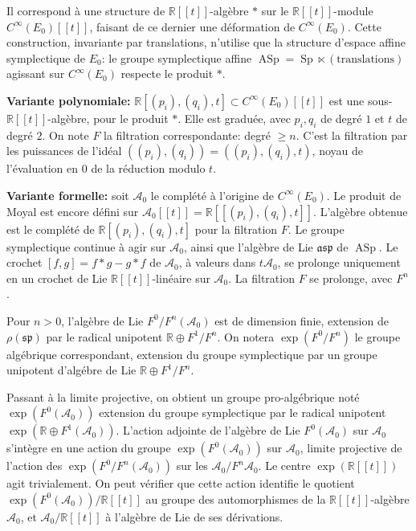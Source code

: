 \documentclass[11pt,a4paper]{article}
\theoremstyle{plain}
\theoremstyle{definition}
\DeclareMathOperator{\Sp}{Sp}
\DeclareMathOperator{\ASp}{ASp}
\newcommand{\R}{\mathbb{R}}
\begin{document}
Il correspond \`a une structure de $\R[[t]]$-alg\`ebre $*$ sur le $\R[[t]]$-module $C^{\infty}(E_{0})[[t]]$,
faisant de ce dernier une d\'eformation de $C^{\infty}(E_{0})$. Cette construction, invariante
par translations, n'utilise que la structure d'espace affine symplectique de $E_{0}$: le
groupe symplectique affine $\ASp = \Sp \ltimes (\text{translations})$ agissant sur $C^{\infty}(E_{0})$ respecte
le produit $*$.

\textbf{Variante polynomiale:} $\R[(p_{i}),(q_{i}),t] \subset C^{\infty}(E_{0})[[t]]$ est une sous-$\R[[t]]$-alg\`ebre,
pour le produit $*$. Elle est gradu\'ee, avec $p_{i}, q_{i}$ de degr\'e $1$ et $t$ de degr\'e $2$. On note
$F$ la filtration correspondante: degr\'e $\geq n$. C'est la filtration par les puissances de
l'id\'eal $((p_{i}),(q_{i})) = ((p_{i}),(q_{i}),t)$, noyau de l'\'evaluation en $0$ de la r\'eduction modulo $t$.

\textbf{Variante formelle:} soit $\mathcal{A}_{0}$ le compl\'et\'e \`a l'origine de $C^{\infty}(E_{0})$. Le produit de
Moyal est encore d\'efini sur $\mathcal{A}_{0}[[t]] = \R[[(p_{i}),(q_{i}),t]]$. L'alg\`ebre obtenue est le
compl\'et\'e de $\R[(p_{i}),(q_{i}),t]$ pour la filtration $F$. Le groupe symplectique continue \`a
agir sur $\mathcal{A}_{0}$, ainsi que l'alg\`ebre de Lie $\mathfrak{asp}$ de $\ASp$. Le crochet $[f,g] = f * g - g * f$ de
$\mathcal{A}_{0}$, \`a valeurs dans $t\mathcal{A}_{0}$, se prolonge uniquement en un crochet de Lie $\R[[t]]$-lin\'eaire
sur $\mathcal{A}_{0}$. La filtration $F$ se prolonge, avec $F^{n}$.

Pour $n > 0$, l'alg\`ebre de Lie $F^{0}/F^{n}(\mathcal{A}_{0})$ est de dimension finie, extension de $\rho(\mathfrak{sp})$ par le radical unipotent $\R \oplus F^{1}/F^{n}$. On notera $\exp(F^{0}/F^{n})$ le groupe alg\'ebrique correspondant, extension du groupe symplectique par un groupe unipotent d'alg\'ebre de Lie $\R \oplus F^{1}/F^{n}$.

Passant \`a la limite projective, on obtient un groupe pro-alg\'ebrique not\'e
$\exp(F^{0}(\mathcal{A}_{0}))$ extension du groupe symplectique par le radical unipotent $\exp(\R \oplus F^{1}(\mathcal{A}_{0}))$. L'action adjointe de l'alg\`ebre de Lie $F^{0}(\mathcal{A}_{0})$ sur $\mathcal{A}_{0}$ s'int\`egre en une action du groupe $\exp(F^{0}(\mathcal{A}_{0}))$ sur $\mathcal{A}_{0}$, limite projective de l'action
des $\exp(F^{0}/F^{n}(\mathcal{A}_{0}))$ sur les $\mathcal{A}_{0}/F^{n}\mathcal{A}_{0}$. Le centre $\exp(\R[[t]])$ agit trivialement. On peut v\'erifier que cette action identifie le quotient $\exp(F^{0}(\mathcal{A}_{0}))/\R[[t]]$ au groupe des automorphismes de la $\R[[t]]$-alg\`ebre $\mathcal{A}_{0}$, et $\mathcal{A}_{0}/\R[[t]]$ \`a l'alg\`ebre de Lie de ses d\'erivations.
\end{document}
